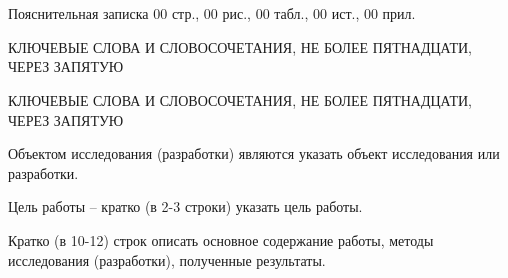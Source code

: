 \chapter*{}
\setcounter{page}{4}

\lipsum[1]

Пояснительная записка 00 стр., 00 рис., 00 табл., 00 ист., 00 прил.

КЛЮЧЕВЫЕ СЛОВА И СЛОВОСОЧЕТАНИЯ, НЕ БОЛЕЕ ПЯТНАДЦАТИ, ЧЕРЕЗ ЗАПЯТУЮ

\uppercase{Ключевые слова и словосочетания, не более пятнадцати, через запятую}

Объектом исследования (разработки) являются указать объект исследования или разработки.

Цель работы – кратко (в 2-3 строки) указать цель работы.

Кратко (в 10-12) строк описать основное содержание работы, методы исследования (разработки), полученные результаты.
